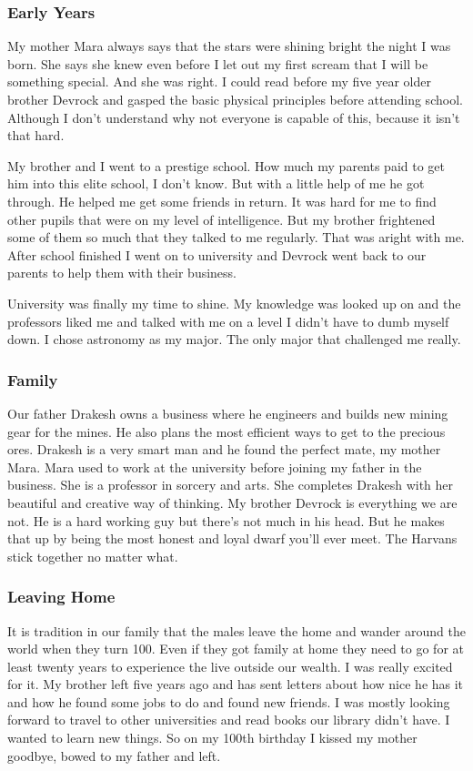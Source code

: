 \documentclass[letterpaper,10pt,twoside,twocolumn,openany]{book}
\begin{document}
		\subsubsection{Early Years}
		My mother Mara always says that the stars were shining bright the night I was born. She says she knew even before I let out my first scream that I will be something special. And she was right. I could read before my five year older brother Devrock and gasped the basic physical principles before attending school. Although I don't understand why not everyone is capable of this, because it isn't that hard. 
		
		My brother and I went to a prestige school. How much my parents paid to get him into this elite school, I don't know. But with a little help of me he got through. He helped me get some friends in return. It was hard for me to find other pupils that were on my level of intelligence. But my brother frightened some of them so much that they talked to me regularly. That was aright with me. After school finished I went on to university and Devrock went back to our parents to help them with their business. 
		
		University was finally my time to shine. My knowledge was looked up on and the professors liked me and talked with me on a level I didn't have to dumb myself down. I chose astronomy as my major. The only major that challenged me really.
		
		\subsubsection{Family} 
		Our father Drakesh owns a business where he engineers and builds new mining gear for the mines. He also plans the most efficient ways to get to the precious ores. Drakesh is a very smart man and he found the perfect mate, my mother Mara. Mara used to work at the university before joining my father in the business. She is a professor in sorcery and arts. She completes Drakesh with her beautiful and creative way of thinking. My brother Devrock is everything we are not. He is a hard working guy but there's not much in his head. But he makes that up by being the most honest and loyal dwarf you'll ever meet. The Harvans stick together no matter what. 
		
		\subsubsection{Leaving Home}
		It is tradition in our family that the males leave the home and wander around the world when they turn 100. Even if they got family at home they need to go for at least twenty years to experience the live outside our wealth. I was really excited for it. My brother left five years ago and has sent letters about how nice he has it and how he found some jobs to do and found new friends. I was mostly looking forward to travel to other universities and read books our library didn't have. I wanted to learn new things. So on my 100th birthday I kissed my mother goodbye, bowed to my father and left. 
		
\end{document}
